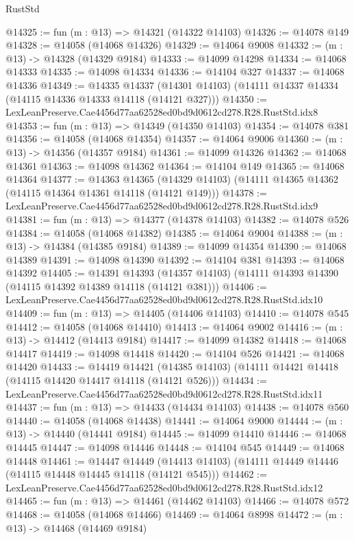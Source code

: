 \begin{lexlean}{RustStd}
\begin{coremodule}
@14325 := fun (m : @13) => @14321 (@14322 @14103)
@14326 := @14078 @149
@14328 := @14058 (@14068 @14326)
@14329 := @14064 @9008
@14332 := (m : @13) -> @14328 (@14329 @9184)
@14333 := @14099 @14298
@14334 := @14068 @14333
@14335 := @14098 @14334
@14336 := @14104 @327
@14337 := @14068 @14336
@14349 := @14335
    @14337
    (@14301 @14103)
    (@14111 @14337 @14334 (@14115 @14336 @14333 @14118 (@14121 @327)))
@14350 := LexLeanPreserve.Cae4456d77aa62528ed0bd9d0612cd278.R28.RustStd.idx8
@14353 := fun (m : @13) => @14349 (@14350 @14103)
@14354 := @14078 @381
@14356 := @14058 (@14068 @14354)
@14357 := @14064 @9006
@14360 := (m : @13) -> @14356 (@14357 @9184)
@14361 := @14099 @14326
@14362 := @14068 @14361
@14363 := @14098 @14362
@14364 := @14104 @149
@14365 := @14068 @14364
@14377 := @14363
    @14365
    (@14329 @14103)
    (@14111 @14365 @14362 (@14115 @14364 @14361 @14118 (@14121 @149)))
@14378 := LexLeanPreserve.Cae4456d77aa62528ed0bd9d0612cd278.R28.RustStd.idx9
@14381 := fun (m : @13) => @14377 (@14378 @14103)
@14382 := @14078 @526
@14384 := @14058 (@14068 @14382)
@14385 := @14064 @9004
@14388 := (m : @13) -> @14384 (@14385 @9184)
@14389 := @14099 @14354
@14390 := @14068 @14389
@14391 := @14098 @14390
@14392 := @14104 @381
@14393 := @14068 @14392
@14405 := @14391
    @14393
    (@14357 @14103)
    (@14111 @14393 @14390 (@14115 @14392 @14389 @14118 (@14121 @381)))
@14406 := LexLeanPreserve.Cae4456d77aa62528ed0bd9d0612cd278.R28.RustStd.idx10
@14409 := fun (m : @13) => @14405 (@14406 @14103)
@14410 := @14078 @545
@14412 := @14058 (@14068 @14410)
@14413 := @14064 @9002
@14416 := (m : @13) -> @14412 (@14413 @9184)
@14417 := @14099 @14382
@14418 := @14068 @14417
@14419 := @14098 @14418
@14420 := @14104 @526
@14421 := @14068 @14420
@14433 := @14419
    @14421
    (@14385 @14103)
    (@14111 @14421 @14418 (@14115 @14420 @14417 @14118 (@14121 @526)))
@14434 := LexLeanPreserve.Cae4456d77aa62528ed0bd9d0612cd278.R28.RustStd.idx11
@14437 := fun (m : @13) => @14433 (@14434 @14103)
@14438 := @14078 @560
@14440 := @14058 (@14068 @14438)
@14441 := @14064 @9000
@14444 := (m : @13) -> @14440 (@14441 @9184)
@14445 := @14099 @14410
@14446 := @14068 @14445
@14447 := @14098 @14446
@14448 := @14104 @545
@14449 := @14068 @14448
@14461 := @14447
    @14449
    (@14413 @14103)
    (@14111 @14449 @14446 (@14115 @14448 @14445 @14118 (@14121 @545)))
@14462 := LexLeanPreserve.Cae4456d77aa62528ed0bd9d0612cd278.R28.RustStd.idx12
@14465 := fun (m : @13) => @14461 (@14462 @14103)
@14466 := @14078 @572
@14468 := @14058 (@14068 @14466)
@14469 := @14064 @8998
@14472 := (m : @13) -> @14468 (@14469 @9184)

\end{coremodule}
\end{lexlean}
